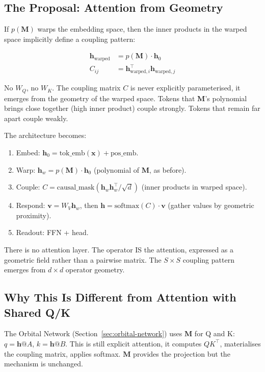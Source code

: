 \documentclass[11pt, a4paper]{article}
\newcommand{\M}{\mathbf{M}}
\newcommand{\x}{\mathbf{x}}
\newcommand{\h}{\mathbf{h}}
\theoremstyle{plain}
\theoremstyle{definition}
\theoremstyle{remark}
\begin{document}
\subsection{The Proposal: Attention from Geometry}

If $p(\M)$ warps the embedding space, then the inner products in the warped space implicitly define a coupling pattern:

\begin{align}
\h_{\text{warped}} &= p(\M) \cdot \h_0 \label{eq:warp} \\
C_{ij} &= \h_{\text{warped},i}^\top \h_{\text{warped},j} \label{eq:implicit-attn}
\end{align}

No $W_Q$, no $W_K$.
The coupling matrix $C$ is never explicitly parameterised, it emerges from the geometry of the warped space.
Tokens that $\M$'s polynomial brings close together (high inner product) couple strongly.
Tokens that remain far apart couple weakly.

The architecture becomes:
\begin{enumerate}[nosep]
\item Embed: $\h_0 = \text{tok\_emb}(\x) + \text{pos\_emb}$.
\item Warp: $\h_w = p(\M) \cdot \h_0$ (polynomial of $\M$, as before).
\item Couple: $C = \text{causal\_mask}\!\left(\h_w \h_w^\top / \sqrt{d}\right)$ (inner products in warped space).
\item Respond: $\mathbf{v} = W_V \h_w$, then $\h = \text{softmax}(C) \cdot \mathbf{v}$ (gather values by geometric proximity).
\item Readout: FFN + head.
\end{enumerate}

There is no attention layer.
The operator IS the attention, expressed as a geometric field rather than a pairwise matrix.
The $S \times S$ coupling pattern emerges from $d \times d$ operator geometry.

\subsection{Why This Is Different from Attention with Shared Q/K}

The Orbital Network (Section~\ref{sec:orbital-network}) uses $\M$ for Q and K: $q = \h @ A$, $k = \h @ B$.
This is still explicit attention, it computes $Q K^\top$, materialises the coupling matrix, applies softmax.
$\M$ provides the projection but the mechanism is unchanged.
\end{document}
